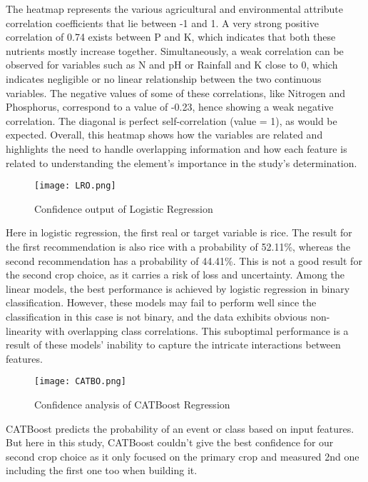 \documentclass[conference]{IEEEtran}
\begin{document}
The heatmap represents the various agricultural and environmental attribute correlation coefficients that lie between -1 and 1. A very strong positive correlation of 0.74 exists between P and K, which indicates that both these nutrients mostly increase together. Simultaneously, a weak correlation can be observed for variables such as N and pH or Rainfall and K close to 0, which indicates negligible or no linear relationship between the two continuous variables. The negative values of some of these correlations, like Nitrogen and Phosphorus, correspond to a value of -0.23, hence showing a weak negative correlation. The diagonal is perfect self-correlation (value = 1), as would be expected. Overall, this heatmap shows how the variables are related and highlights the need to handle overlapping information and how each feature is related to understanding the element’s importance in the study’s determination.

\begin{figure}[h]
    \centering
    \texttt{[image: LRO.png]}
    \caption{Confidence output of Logistic Regression}
    \label{fig:logistic_regression}
\end{figure}




Here in logistic regression, the first real or target variable is rice. The result for the first recommendation is also rice with a probability of 52.11\%, whereas the second recommendation has a probability of 44.41\%. This is not a good result for the second crop choice, as it carries a risk of loss and uncertainty. Among the linear models, the best performance is achieved by logistic regression in binary classification. However, these models may fail to perform well since the classification in this case is not binary, and the data exhibits obvious non-linearity with overlapping class correlations. This suboptimal performance is a result of these models' inability to capture the intricate interactions between features. \cite{geeksforgeekslogistic2025}

\begin{figure}[h]
    \centering
    \texttt{[image: CATBO.png]}
    \caption{Confidence analysis of CATBoost Regression}
    \label{fig:catboost}
\end{figure}

CATBoost predicts the probability of an event or class based on input features. But here in this study, CATBoost couldn’t give the best confidence for our second crop choice as it only focused on the primary crop and measured 2nd one including the first one too when building it. 
\end{document}
